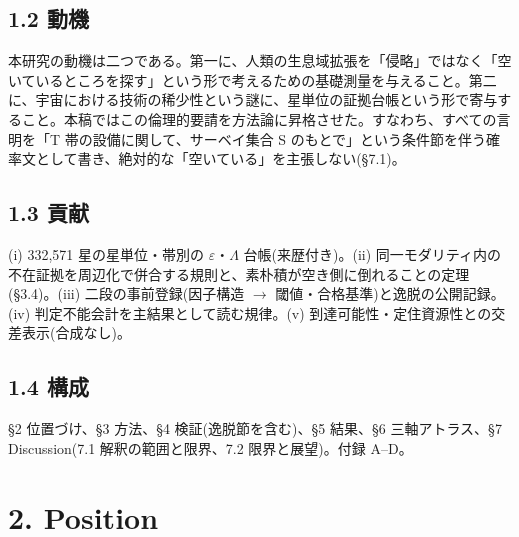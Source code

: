 \documentclass[11pt]{article}
\begin{document}
\subsection*{1.2 動機}
\noindent 本研究の動機は二つである。第一に、人類の生息域拡張を「侵略」ではなく「空いているところを探す」という形で考えるための基礎測量を与えること。第二に、宇宙における技術の稀少性という謎に、星単位の証拠台帳という形で寄与すること。本稿ではこの倫理的要請を方法論に昇格させた。すなわち、すべての言明を「T 帯の設備に関して、サーベイ集合 S のもとで」という条件節を伴う確率文として書き、絶対的な「空いている」を主張しない(\S{}7.1)。\par\smallskip

\subsection*{1.3 貢献}
\noindent (i) 332,571 星の星単位・帯別の \(\varepsilon\)・\(\Lambda\) 台帳(来歴付き)。(ii) 同一モダリティ内の不在証拠を周辺化で併合する規則と、素朴積が空き側に倒れることの定理(\S{}3.4)。(iii) 二段の事前登録(因子構造 \(\rightarrow\) 閾値・合格基準)と逸脱の公開記録。(iv) 判定不能会計を主結果として読む規律。(v) 到達可能性・定住資源性との交差表示(合成なし)。\par\smallskip

\subsection*{1.4 構成}
\noindent \S{}2 位置づけ、\S{}3 方法、\S{}4 検証(逸脱節を含む)、\S{}5 結果、\S{}6 三軸アトラス、\S{}7 Discussion(7.1 解釈の範囲と限界、7.2 限界と展望)。付録 A–D。\par\smallskip

\section*{2. Position}
\end{document}

